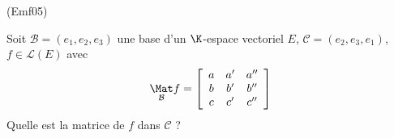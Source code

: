 \begin{tiny}(Emf05)\end{tiny}
Soit $\mathcal{B}=(e_{1},e_{2},e_{3})$ une base d'un $\K$-espace vectoriel $E$, $\mathcal{C}=(e_{2},e_{3},e_{1})$, $f\in \mathcal{L}(E)$ avec
\[
\underset{\mathcal{B}}{\Mat}f=\left[
\begin{array}{ccc}
a & a^{\prime } & a^{\prime \prime } \\
b & b^{\prime } & b^{\prime \prime } \\
c & c^{\prime } & c^{\prime \prime }
\end{array}
\right]
\]
Quelle est la matrice de $f$ dans $\mathcal{C}$ ?